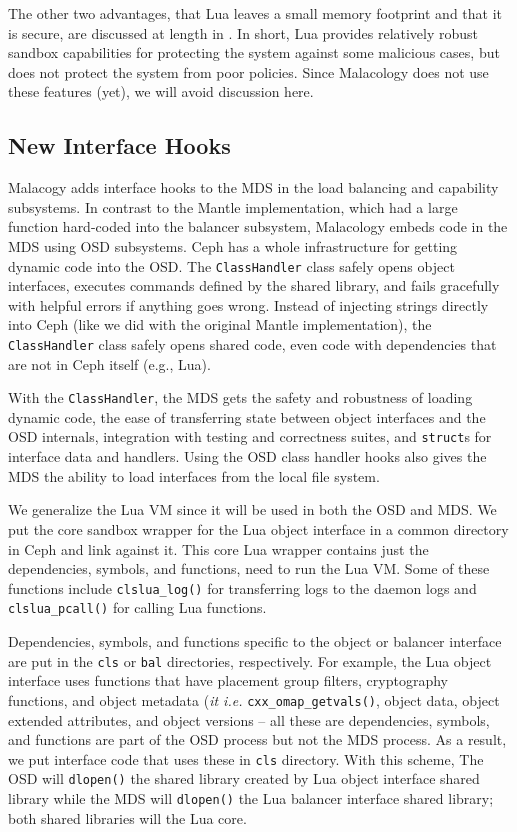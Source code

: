 \documentclass[10pt,twocolumn]{article}
\begin{document}
The other two advantages, that Lua leaves a small memory footprint and
that it is secure, are discussed at length in 
\cite{ierusalimschy_programming_2006,neto:dls14-luaos}. In short, Lua
provides relatively robust sandbox capabilities for protecting the
system against some malicious cases, but does not protect the system
from poor policies. Since Malacology does not use these features (yet),
we will avoid discussion here.

\subsection{New Interface Hooks}\label{new-interface-hooks}

Malacogy adds interface hooks to the MDS in the load balancing and
capability subsystems. In contrast to the Mantle implementation, which
had a large function hard-coded into the balancer subsystem, Malacology
embeds code in the MDS using OSD subsystems. Ceph has a whole
infrastructure for getting dynamic code into the OSD. The
\texttt{ClassHandler} class safely opens object interfaces, executes
commands defined by the shared library, and fails gracefully with
helpful errors if anything goes wrong. Instead of injecting strings
directly into Ceph (like we did with the original Mantle
implementation), the \texttt{ClassHandler} class safely opens shared
code, even code with dependencies that are not in Ceph itself (e.g.,
Lua).

With the \texttt{ClassHandler}, the MDS gets the safety and robustness
of loading dynamic code, the ease of transferring state between object
interfaces and the OSD internals, integration with testing and
correctness suites, and \texttt{struct}s for interface data and
handlers. Using the OSD class handler hooks also gives the MDS the
ability to load interfaces from the local file system.

We generalize the Lua VM since it will be used in both the OSD and MDS.
We put the core sandbox wrapper for the Lua object interface in a common
directory in Ceph and link against it. This core Lua wrapper contains
just the dependencies, symbols, and functions, need to run the Lua VM.
Some of these functions include \texttt{clslua\_log()} for transferring
logs to the daemon logs and \texttt{clslua\_pcall()} for calling Lua
functions.

Dependencies, symbols, and functions specific to the object or balancer
interface are put in the \texttt{cls} or \texttt{bal} directories,
respectively. For example, the Lua object interface uses functions that
have placement group filters, cryptography functions, and object
metadata (\emph{it i.e.} \texttt{cxx\_omap\_getvals()}, object data,
object extended attributes, and object versions -- all these are
dependencies, symbols, and functions are part of the OSD process but not
the MDS process. As a result, we put interface code that uses these in
\texttt{cls} directory. With this scheme, The OSD will \texttt{dlopen()}
the shared library created by Lua object interface shared library while
the MDS will \texttt{dlopen()} the Lua balancer interface shared
library; both shared libraries will the Lua core.
\end{document}
